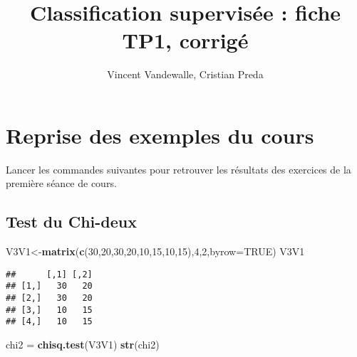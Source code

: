 \documentclass[
]{article}
\title{Classification supervisée : fiche TP1, corrigé}
\author{Vincent Vandewalle, Cristian Preda}
\date{}
\newenvironment{Shaded}{\begin{snugshade}}{\end{snugshade}}
\newcommand{\DataTypeTok}[1]{\textcolor[rgb]{0.13,0.29,0.53}{#1}}
\newcommand{\DecValTok}[1]{\textcolor[rgb]{0.00,0.00,0.81}{#1}}
\newcommand{\KeywordTok}[1]{\textcolor[rgb]{0.13,0.29,0.53}{\textbf{#1}}}
\newcommand{\NormalTok}[1]{#1}
\newcommand{\OperatorTok}[1]{\textcolor[rgb]{0.81,0.36,0.00}{\textbf{#1}}}
\newcommand{\OtherTok}[1]{\textcolor[rgb]{0.56,0.35,0.01}{#1}}
\newcommand{\StringTok}[1]{\textcolor[rgb]{0.31,0.60,0.02}{#1}}
\begin{document}
\maketitle

{
\setcounter{tocdepth}{2}
\tableofcontents
}
\begin{Shaded}
\end{Shaded}

\hypertarget{reprise-des-exemples-du-cours}{%
\section{Reprise des exemples du
cours}\label{reprise-des-exemples-du-cours}}

Lancer les commandes suivantes pour retrouver les résultats des
exercices de la première séance de cours.

\hypertarget{test-du-chi-deux}{%
\subsection{Test du Chi-deux}\label{test-du-chi-deux}}

\begin{Shaded}
\begin{Highlighting}[]
\NormalTok{V3V1<-}\KeywordTok{matrix}\NormalTok{(}\KeywordTok{c}\NormalTok{(}\DecValTok{30}\NormalTok{,}\DecValTok{20}\NormalTok{,}\DecValTok{30}\NormalTok{,}\DecValTok{20}\NormalTok{,}\DecValTok{10}\NormalTok{,}\DecValTok{15}\NormalTok{,}\DecValTok{10}\NormalTok{,}\DecValTok{15}\NormalTok{),}\DecValTok{4}\NormalTok{,}\DecValTok{2}\NormalTok{,}\DataTypeTok{byrow=}\OtherTok{TRUE}\NormalTok{)}
\NormalTok{V3V1}
\end{Highlighting}
\end{Shaded}

\begin{verbatim}
##      [,1] [,2]
## [1,]   30   20
## [2,]   30   20
## [3,]   10   15
## [4,]   10   15
\end{verbatim}

\begin{Shaded}
\begin{Highlighting}[]
\NormalTok{chi2 =}\StringTok{ }\KeywordTok{chisq.test}\NormalTok{(V3V1)}
\KeywordTok{str}\NormalTok{(chi2)}
\end{Highlighting}
\end{Shaded}
\end{document}
